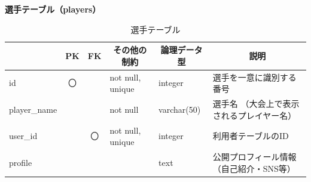 \noindent\textbf{選手テーブル（players）}
\begin{table}[H]
    \centering
    \caption{選手テーブル}
    \label{tab:players_table}
    \begin{tabularx}{\linewidth}{|l|c|c|l|l|X|}
        \hline
        \rowcolor{tableblue}
        \multicolumn{1}{|c|}{カラム名} & \multicolumn{1}{c|}{PK} & \multicolumn{1}{c|}{FK} & \multicolumn{1}{c|}{その他の制約} & \multicolumn{1}{c|}{論理データ型} & \multicolumn{1}{c|}{説明} \\ \hline
        id & 〇 &  & not null, unique & integer & 選手を一意に識別する番号 \\ \hline
        player\_name &  &  & not null & varchar(50) & 選手名 \newline（大会上で表示されるプレイヤー名） \\ \hline
        user\_id &  & 〇 & not null, unique & integer & 利用者テーブルのID \\ \hline
        profile & & & & text & 公開プロフィール情報 \newline（自己紹介・SNS等） \\ \hline
    \end{tabularx}
\end{table}


